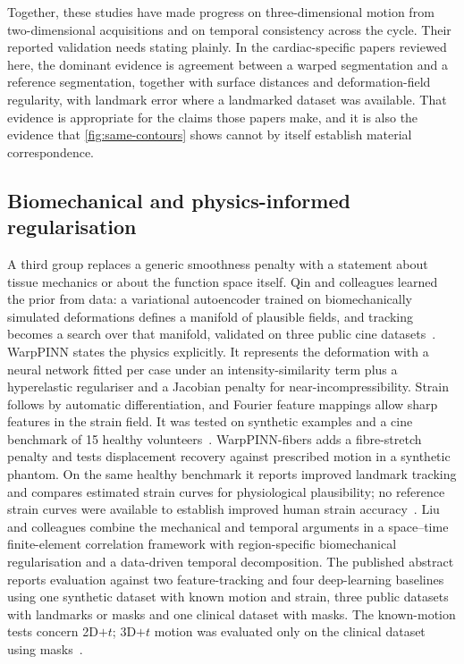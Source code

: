 Together, these studies have made progress on three-dimensional motion from two-dimensional acquisitions and on temporal consistency across the cycle. Their reported validation needs stating plainly. In the cardiac-specific papers reviewed here, the dominant evidence is agreement between a warped segmentation and a reference segmentation, together with surface distances and deformation-field regularity, with landmark error where a landmarked dataset was available. That evidence is appropriate for the claims those papers make, and it is also the evidence that \cref{fig:same-contours} shows cannot by itself establish material correspondence.

\subsection{Biomechanical and physics-informed regularisation}\label{sec:physics}

A third group replaces a generic smoothness penalty with a statement about tissue mechanics or about the function space itself. Qin and colleagues learned the prior from data: a variational autoencoder trained on biomechanically simulated deformations defines a manifold of plausible fields, and tracking becomes a search over that manifold, validated on three public cine datasets~\cite{qin2023biomech}. WarpPINN states the physics explicitly. It represents the deformation with a neural network fitted per case under an intensity-similarity term plus a hyperelastic regulariser and a Jacobian penalty for near-incompressibility. Strain follows by automatic differentiation, and Fourier feature mappings allow sharp features in the strain field. It was tested on synthetic examples and a cine benchmark of 15 healthy volunteers~\cite{arratia2023warppinn}. WarpPINN-fibers adds a fibre-stretch penalty and tests displacement recovery against prescribed motion in a synthetic phantom. On the same healthy benchmark it reports improved landmark tracking and compares estimated strain curves for physiological plausibility; no reference strain curves were available to establish improved human strain accuracy~\cite{alvarez2026warppinn}. Liu and colleagues combine the mechanical and temporal arguments in a space--time finite-element correlation framework with region-specific biomechanical regularisation and a data-driven temporal decomposition. The published abstract reports evaluation against two feature-tracking and four deep-learning baselines using one synthetic dataset with known motion and strain, three public datasets with landmarks or masks and one clinical dataset with masks. The known-motion tests concern 2D\(+t\); 3D\(+t\) motion was evaluated only on the clinical dataset using masks~\cite{liu2026fe}.

